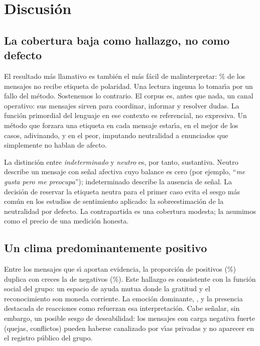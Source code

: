 \section{Discusión}
\label{sec:discusion}

\subsection{La cobertura baja como hallazgo, no como defecto}

El resultado más llamativo es también el más fácil de malinterpretar: \pctIndeterminado{}\%
de los mensajes no recibe etiqueta de polaridad. Una lectura ingenua lo tomar\'\i{}a por
un fallo del m\'etodo. Sostenemos lo contrario. El corpus es, antes que nada, un canal
operativo: sus mensajes sirven para coordinar, informar y resolver dudas. La funci\'on
primordial del lenguaje en ese contexto es referencial, no expresiva. Un m\'etodo que
forzara una etiqueta en cada mensaje estar\'\i{}a, en el mejor de los casos, adivinando, y
en el peor, imputando neutralidad a enunciados que simplemente no hablan de afecto.

La distinci\'on entre \emph{indeterminado} y \emph{neutro} es, por tanto, sustantiva.
Neutro describe un mensaje con se\~nal afectiva cuyo balance es cero (por ejemplo,
``\emph{me gusta pero me preocupa}''); indeterminado describe la ausencia de se\~nal. La
decisi\'on de reservar la etiqueta neutra para el primer caso evita el sesgo m\'as com\'un
en los estudios de sentimiento aplicado: la sobreestimaci\'on de la neutralidad por
defecto. La contrapartida es una cobertura modesta; la asumimos como el precio de una
medici\'on honesta.

\subsection{Un clima predominantemente positivo}

Entre los mensajes que s\'\i{} aportan evidencia, la proporci\'on de positivos
(\pctPositivos{}\%) duplica con creces la de negativos (\pctNegativos{}\%). Este hallazgo
es consistente con la funci\'on social del grupo: un espacio de ayuda mutua donde la
gratitud y el reconocimiento son moneda corriente. La emoci\'on dominante,
\emph{\emocionTop{}}, y la presencia destacada de reacciones como \reactTop{} refuerzan
esa interpretaci\'on. Cabe se\~nalar, sin embargo, un posible sesgo de deseabilidad: los
mensajes con carga negativa fuerte (quejas, conflictos) pueden haberse canalizado por
v\'\i{}as privadas y no aparecer en el registro p\'ublico del grupo.


